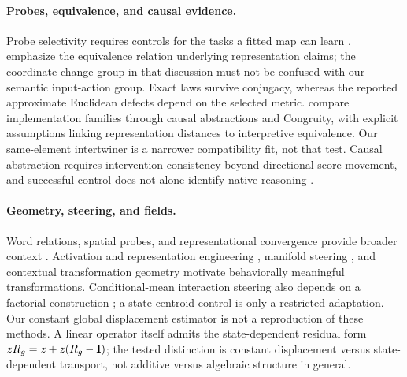 \paragraph{Probes, equivalence, and causal evidence.}
Probe selectivity requires controls for the tasks a fitted map can learn \citep{hewitt2019designing}. \citet{yao2026groupaction} emphasize the equivalence relation underlying representation claims; the coordinate-change group in that discussion must not be confused with our semantic input-action group. Exact laws survive conjugacy, whereas the reported approximate Euclidean defects depend on the selected metric. \citet{sun2026tracking} compare implementation families through causal abstractions and Congruity, with explicit assumptions linking representation distances to interpretive equivalence. Our same-element intertwiner is a narrower compatibility fit, not that test. Causal abstraction requires intervention consistency beyond directional score movement, and successful control does not alone identify native reasoning \citep{geiger2022inducing,geiger2025causal}.

\paragraph{Geometry, steering, and fields.}
Word relations, spatial probes, and representational convergence provide broader context \citep{mikolov2013linguistic,bolukbasi2016man,gurnee2023language,huh2024platonic}. Activation and representation engineering \citep{turner2023activation,zou2023representation}, manifold steering \citep{wurgaft2026manifold}, and contextual transformation geometry \citep{hu2026language} motivate behaviorally meaningful transformations. Conditional-mean interaction steering also depends on a factorial construction \citep{arora2026causal}; a state-centroid control is only a restricted adaptation. Our constant global displacement estimator is not a reproduction of these methods. A linear operator itself admits the state-dependent residual form $zR_g=z+z(R_g-\mathbf{I})$; the tested distinction is constant displacement versus state-dependent transport, not additive versus algebraic structure in general.

